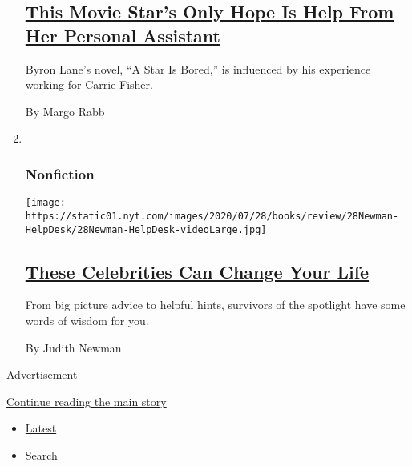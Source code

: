 \begin{enumerate}
{  \subsection{\texorpdfstring{\href{/2020/07/28/books/review/a-star-is-bored-byron-lane.html}{This
  Movie Star's Only Hope Is Help From Her Personal
  Assistant}}{This Movie Star's Only Hope Is Help From Her Personal Assistant}}\label{this-movie-stars-only-hope-is-help-from-her-personal-assistant}}

  Byron Lane's novel, ``A Star Is Bored,'' is influenced by his
  experience working for Carrie Fisher.

  By Margo Rabb
\item ~
  \hypertarget{nonfiction-6}{%
  \subsubsection{Nonfiction}\label{nonfiction-6}}

  \texttt{[image: https://static01.nyt.com/images/2020/07/28/books/review/28Newman-HelpDesk/28Newman-HelpDesk-videoLarge.jpg]}

  \hypertarget{these-celebrities-can-change-your-life}{%
  \subsection{\texorpdfstring{\href{/2020/07/28/books/review/hustle-harder-hustle-smarter-curtis-jackson.html}{These
  Celebrities Can Change Your
  Life}}{These Celebrities Can Change Your Life}}\label{these-celebrities-can-change-your-life}}

  From big picture advice to helpful hints, survivors of the spotlight
  have some words of wisdom for you.

  By Judith Newman
\end{enumerate}

Advertisement

\protect\hyperlink{after-mid1}{Continue reading the main story}

\begin{itemize}
\tightlist
\item
  \protect\hyperlink{stream-panel}{Latest}
\item
  Search
\end{itemize}

